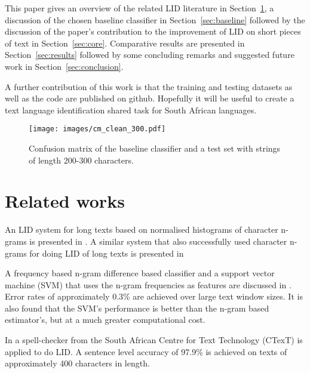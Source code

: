\documentclass[conference]{IEEEtran}
\begin{document}
This paper gives an overview of the related LID literature in Section~\ref{sec:related_works}, a discussion of the chosen baseline classifier in Section~\ref{sec:baseline} followed by the discussion of the paper's contribution to the improvement of LID on short pieces of text in Section~\ref{sec:core}. Comparative results are presented in Section~\ref{sec:results} followed by some concluding remarks and suggested future work in Section~\ref{sec:conclusion}.

A further contribution of this work is that the training and testing datasets as well as the code are published on github. Hopefully it will be useful to create a text language identification shared task for South African languages.

\begin{figure*}[!t]
\centering
\texttt{[image: images/cm\_clean\_300.pdf]}
\caption{Confusion matrix of the baseline classifier and a test set with strings of length 200-300 characters.}
\label{fig:cm_clean_300}
\end{figure*}


\section{Related works}
\label{sec:related_works}
An LID system for long texts based on normalised histograms of character n-grams is presented in \cite{CombrinckBotha1995}. A similar system that also successfully used character n-grams for doing LID of long texts is presented in \cite{CavnerTrenkle1997}

A frequency based n-gram difference based classifier and a support vector machine (SVM) that uses the n-gram frequencies as features are discussed in \cite{BothaZimuBarnard2006}. Error rates of approximately 0.3\% are achieved over large text window sizes. It is also found that the SVM's performance is better than the n-gram based estimator's, but at a much greater computational cost.

In \cite{PienaarSnyman2010} a spell-checker from the South African Centre for Text Technology (CTexT) is applied to do LID. A sentence level accuracy of 97.9\% is achieved on texts of approximately 400 characters in length.
\end{document}
